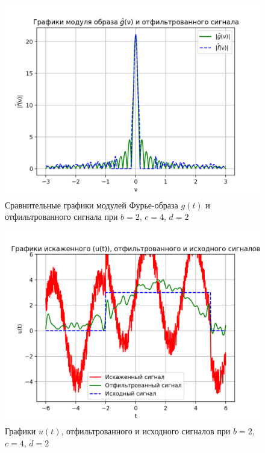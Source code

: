 \begin{figure}[ht!]
    \centering
    \includegraphics[scale=0.55]{media/1 task/specific_freq/Fourier_Image_Comparison_2_4_2_-0,65:-0,153_-0,8044:-0,72.png}
    \caption{Сравнительные графики модулей Фурье-образа $g(t)$ и отфильтрованного сигнала при $b=2$,  $c=4$,  $d=2$}
    \label{fig:fourc_2_4_2_2intervlas}
\end{figure}

\begin{figure}[ht!]
    \centering
    \includegraphics[scale=0.65]{media/1 task/specific_freq/Cleaned_2_4_2_-0,65:-0,153_-0,8044:-0,72.png}
    \caption{Графики  $u(t)$, отфильтрованного и исходного сигналов при $b=2$,  $c=4$,  $d=2$}
    \label{fig:cleaned_2_4_2_2intervals}
\end{figure}

